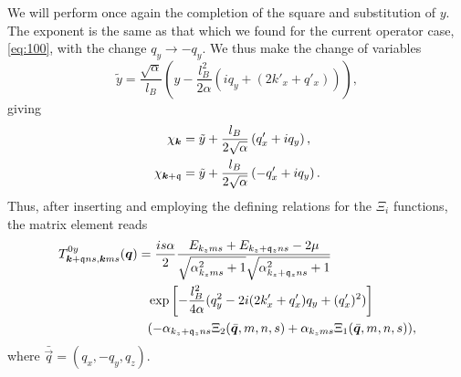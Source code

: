 We will perform once again the completion of the square and substitution of \(y\).
The exponent is the same as that which we found for the current operator case, \cref{eq:100}, with the change \(q_{y} \to - q_{y}\).
We thus make the change of variables
\begin{equation}
  \label{eq:110}
  \tilde{y} = \frac{\sqrt{\alpha}}{l_{B}} \left(y  - \frac{l_{B}^2}{2 \alpha } (i q_{y} + (2k' _x + q' _x) )\right),
\end{equation}
giving
\begin{align}
  \chi _{\bm{k}} &= \tilde{y} + \frac{l_{B}}{2 \sqrt{\alpha }} \left( q'_x + i q_{y}\right),\\
  \chi _{\bm{k} + \mathfrak{q}} &= \tilde{y} + \frac{l_{B}}{2 \sqrt{\alpha }} \left( -q' _{x} + i q_{y}\right).
\end{align}
Thus, after inserting and employing the defining relations for the \( \Xi_i \) functions, the matrix element reads
\begin{align}
  T_{\vec{k} + \qvec{q} n s, \vec{k} m s}^{0y} (\vec{q}) &=
  \frac{is \alpha }{2 }
  \frac{E_{k_z m s} + E_{k_z + \qvec{q}_z n s} - 2 \mu}{
    \sqrt{\alpha_{k_z m s}^2 + 1}
    \sqrt{\alpha_{k_z + \qvec{q}_z n s}^2 + 1}
  }\\
  &\pe \exp \left[
    -\frac{l_{B}^2}{4 \alpha } (q_{y}^2 - 2i ( 2k' _x + q' _x ) q_{y} + (q' _x)^2)
  \right  ]\\
  &\pe (-\alpha_{k_z + \qvec{q}_z n s} \Xi_{2} (\bar{\vec{q}}, m, n, s) + \alpha_{k_z m s} \Xi_{1}(\bar{\vec{q}}, m, n, s)),
\end{align}
where \(\bar{\vec{q}} = (q_{x}, -q_{y}, q_{z})\).

